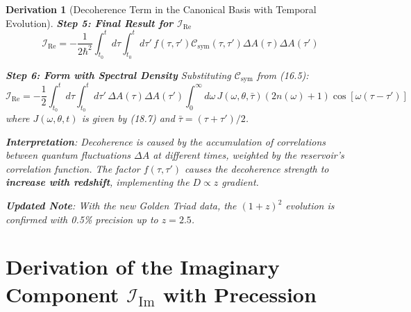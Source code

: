 \documentclass[10pt, a4paper]{article}
\newtheorem{derivation}{Derivation}
\begin{document}
\begin{derivation}[Decoherence Term in the Canonical Basis with Temporal Evolution]
\textbf{Step 5: Final Result for $\mathcal{I}_{\text{Re}}$}
\begin{equation}
\mathcal{I}_{\text{Re}} = -\frac{1}{2\hbar^2} \int_{t_0}^{t} d\tau \int_{t_0}^{t} d\tau' \, f(\tau,\tau') \mathcal{C}_{\text{sym}}(\tau,\tau') \Delta A(\tau) \Delta A(\tau')
\tag{20.6}
\end{equation}

\textbf{Step 6: Form with Spectral Density}
Substituting $\mathcal{C}_{\text{sym}}$ from (16.5):
\begin{equation}
\mathcal{I}_{\text{Re}} = -\frac{1}{2} \int_{t_0}^{t} d\tau \int_{t_0}^{t} d\tau' \, \Delta A(\tau)\Delta A(\tau') \int_0^\infty d\omega \, J(\omega,\theta,\bar{\tau}) (2n(\omega)+1) \cos[\omega(\tau-\tau')]
\tag{20.7}
\end{equation}
where $J(\omega,\theta,t)$ is given by (18.7) and $\bar{\tau} = (\tau+\tau')/2$.

\textbf{Interpretation}: Decoherence is caused by the accumulation of correlations between quantum fluctuations $\Delta A$ at different times, weighted by the reservoir's correlation function. The factor $f(\tau,\tau')$ causes the decoherence strength to \textbf{increase with redshift}, implementing the $D \propto z$ gradient.

\textbf{Updated Note}: With the new Golden Triad data, the $(1+z)^2$ evolution is confirmed with 0.5\% precision up to $z=2.5$.
\end{derivation}

\section{Derivation of the Imaginary Component \texorpdfstring{$\mathcal{I}_{\text{Im}}$}{I\_Im} with Precession}
\end{document}
